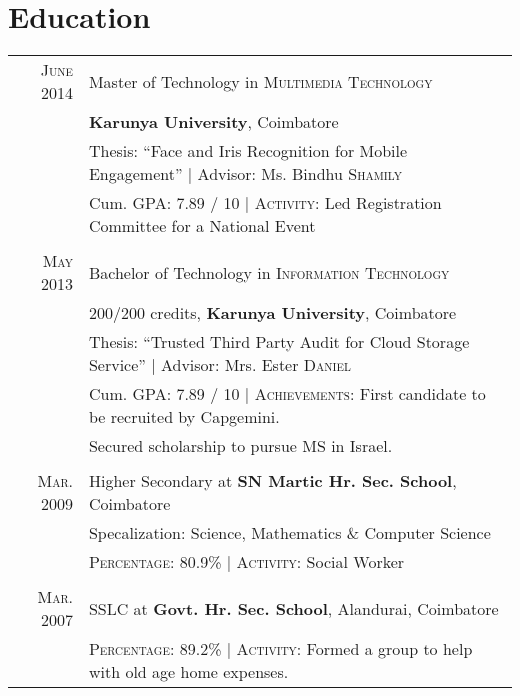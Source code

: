 \documentclass[a4paper,10pt]{article}
\begin{document}
\section{Education}
\begin{tabular}{rl}	

\textsc{June} 2014 & Master of Technology in \textsc{Multimedia Technology} \\&\normalsize\textbf{Karunya University}, Coimbatore\\
& Thesis: ``Face and Iris Recognition for Mobile Engagement'' | \small Advisor: Ms. Bindhu \textsc{Shamily}\\
&\normalsize Cum. \textsc{GPA}: 7.89 / 10 | \textsc{Activity:} Led Registration Committee for a National Event
\\&\\

\textsc{May} 2013 & Bachelor of Technology in \textsc{Information Technology} \\&200/200 credits, \normalsize\textbf{Karunya University}, Coimbatore\\
& Thesis: ``Trusted Third Party Audit for Cloud Storage Service'' | \small Advisor: Mrs. Ester \textsc{Daniel}\\
&\normalsize Cum. \textsc{GPA}: 7.89 / 10 | \textsc{Achievements:} First candidate to be recruited by Capgemini.\\
&\hspace{16em} Secured scholarship to pursue MS in Israel.
\\&\\

\textsc{Mar.} 2009& Higher Secondary at \textbf{SN Martic Hr. Sec. School}, Coimbatore\\
& Specalization: Science, Mathematics \& Computer Science\\
&\textsc{Percentage}: 80.9\% | \textsc{Activity:} Social Worker
\\&\\

\textsc{Mar.} 2007& SSLC at \textbf{Govt. Hr. Sec. School}, Alandurai, Coimbatore\\
&\textsc{Percentage}: 89.2\% | \textsc{Activity:} Formed a group to help with old age home expenses.
\end{tabular}
\end{document}
